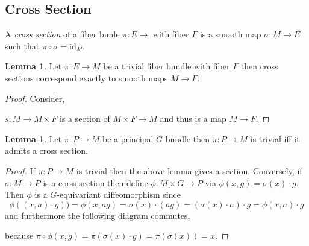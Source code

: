 \documentclass[12pt]{extarticle}
\newcommand{\id}{\mathrm{id}}
\theoremstyle{definition}
\newtheorem{lemma}[theorem]{Lemma}
\newenvironment{definition}[1][Definition:]{\begin{trivlist}
\item[\hskip \labelsep {\bfseries #1}]}{\end{trivlist}}
\begin{document}
\subsection{Cross Section}

\begin{definition}
A \textit{cross section} of a fiber bunle $\pi : E \to $ with fiber $F$ is a smooth map $\sigma : M \to E$ such that $\pi \circ \sigma = \id_M$.
\end{definition}


\begin{lemma}
Let $\pi : E \to M$ be a trivial fiber bundle with fiber $F$ then cross sections correspond exactly to smooth maps $M \to F$.
\end{lemma}

\begin{proof}
Consider,
\begin{center}
\end{center}
$s : M \to M \times F$ is a section of $M \times F \to M$ and thus is a map $M \to F$.
\end{proof}

\begin{lemma}
Let $\pi : P \to M$ be a principal $G$-bundle then $\pi : P \to M$ is trivial iff it admits a cross section.
\end{lemma}

\begin{proof}
If $\pi : P \to M$ is trivial then the above lemma gives a section. Conversely, if $\sigma : M \to P$ is a corss section then define $\phi : M \times G \to P$ via $\phi(x,g) = \sigma(x) \cdot g$. Then $\phi$ is a $G$-equivariant diffeomorphism since 
\[ \phi((x, a) \cdot g)) = \phi(x,ag) = \sigma(x) \cdot (ag) = (\sigma(x) \cdot a) \cdot g = \phi(x,a) \cdot g \]
and furthermore the following diagram commutes,
\begin{center}
\end{center}
because $\pi \circ \phi(x,g) = \pi(\sigma(x) \cdot g) = \pi(\sigma(x)) = x$. 
\end{proof}
\end{document}
